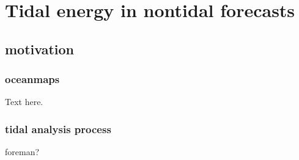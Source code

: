
\chapter{Tidal energy in nontidal forecasts}

\section{motivation}

\subsection{oceanmaps}
Text here.


\subsection{tidal analysis process}
foreman?



